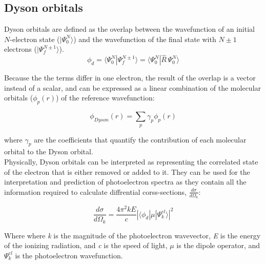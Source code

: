 \subsection{Dyson orbitals}

Dyson orbitals are defined as the overlap between the wavefunction of an initial $N$-electron state ($|\Psi_0^N\rangle$) and the wavefunction of the final state with $N\pm1$ electrons ($|\Psi_f^{N\pm1}\rangle$).
\begin{equation}\label{eq:dyson}
    \phi_{d} = \langle \Psi_0^N | \Psi_f^{N\pm1} \rangle = \langle \Psi_0^N | \hat{R}\,\Psi_0^{N} \rangle 
\end{equation}

Because the the terms differ in one electron, the result of the overlap is a vector instead of a scalar, and can be expressed as a linear combination of the molecular orbitals ($\phi_p(r)$) of the reference wavefunction:

\begin{equation}
    \phi_{Dyson}(r) = \sum_p \gamma_p \phi_p(r)
\end{equation}

where $\gamma_p$ are the coefficients that quantify the contribution of each molecular orbital to the Dyson orbital.\\

Physically, Dyson orbitals can be interpreted as representing the correlated state of the electron that is either removed or added to it. They can be used for the interpretation and prediction of photoelectron spectra as they contain all the information required to calculate diffrential corss-sections, $\frac{d\sigma}{d\Omega_k}$:

\begin{equation}
    \frac{d\sigma}{d\Omega_k} = \frac{4\pi^2kE}{c}|\langle \phi_d | \mu | \Psi^{el}_k \rangle |^2
\end{equation}

Where where \textit{k} is the magnitude of the photoelectron wavevector, \textit{E} is the energy of the ionizing radiation, and \textit{c} is the speed of light, $\mu$ is the dipole operator, and $\Psi^{el}_k$ is the photoelectron wavefunction. 

\cleardoublepage

